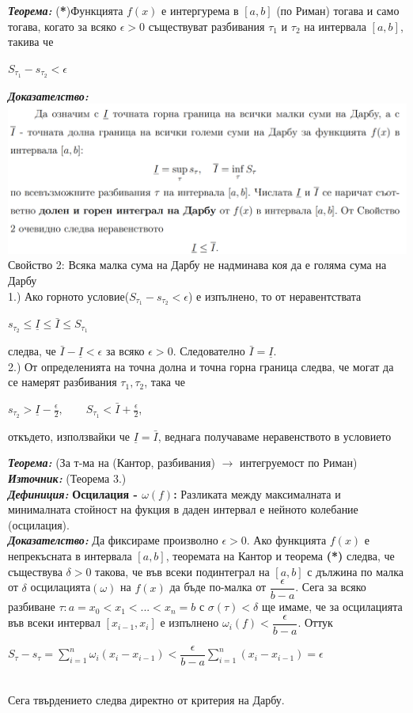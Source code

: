 \documentclass[11pt]{article} %
\newcommand{\italicBold}[1]{\textbf{\emph{#1}}}
\newcommand{\definition}{\italicBold{Дефиниция: }}
\newcommand{\theorem}{\italicBold{Теорема: }}
\newcommand{\proof}{\italicBold{Доказателство: }}
\newcommand{\source}{\italicBold{Източник: }}
\begin{document}
\theorem (\textbf{*})Функцията $f(x)$ е интергурема в $[a,b]$ (по Риман) тогава и само тогава, когато за всяко $\epsilon > 0$ съществуват разбивания $\tau_{1}$ и $\tau_{2}$ на интервала $[a,b]$, такива че \\
\centerline{$S_{\tau_1}-s_{\tau_2} < \epsilon$}
\proof \\
\includegraphics[scale=0.45]{UpperLowerDarbouxIntegral.png}
\\
Свойство 2: Всяка малка сума на Дарбу не надминава коя да е голяма сума на Дарбу\\
1.) Ако горното условие($S_{\tau_1}-s_{\tau_2}<\epsilon$) е изпълнено, то от неравентствата\\
\centerline{$s_{\tau_2} \leq \underline{I} \leq \bar{I} \leq S_{\tau_1}$}
следва, че $\bar{I}-\underline{I} < \epsilon$ за всяко $\epsilon > 0$. Следователно $\bar{I}=\underline{I}$.\\
2.) От определенията на точна долна и точна горна граница следва, че могат да се намерят разбивания $\tau_{1}, \tau_{2}$, така че\\
\centerline{$s_{\tau_2} > \underline{I}-\frac{\epsilon}{2}, \qquad S_{\tau_1} < \bar{I} + \frac{\epsilon}{2}$,}
откъдето, използвайки че $\underline{I} = \bar{I}$, веднага получаваме неравенството в условието\\\par

\theorem (За т-ма на (Кантор, разбивания) $\rightarrow$ интегруемост по Риман)
\source {} (Теорема 3.) \\
\definition \textbf{Осцилация - $\omega(f)$: } Разликата между максималната и минималната стойност на фукция в даден интервал е нейното колебание (осцилация).\\
\proof Да фиксираме произволно $\epsilon > 0$. Ако функцията $f(x)$ е непрекъсната в интервала $[a,b]$, теоремата на Кантор и теорема \textbf{(*)} следва, че съществува $\delta > 0$ такова, че във всеки подинтеграл на $[a,b]$ с дължина по малка от $\delta$ осцилацията$(\omega)$ на $f(x)$ да бъде по-малка от $\dfrac{\epsilon}{b-a}$. Сега за всяко разбиване $\tau : a = x_{0} < x_{1} < ... < x_{n} = b$ с $\sigma(\tau) < \delta$ ще имаме, че за осцилацията във всеки интервал $[x_{i-1}, x_{i}]$ е изпълнено $\omega_{i}(f) < \dfrac{\epsilon}{b-a}$. Оттук\\
\centerline{$S_{\tau}-s_{\tau}=\displaystyle \sum_{i=1}^{n}\omega_{i}(x_{i}-x_{i-1}) < \dfrac{\epsilon}{b-a}\sum_{i=1}^{n}(x_{i}-x_{i-1})=\epsilon$}\\
Сега твърдението следва директно от критерия на Дарбу.
\end{document}
